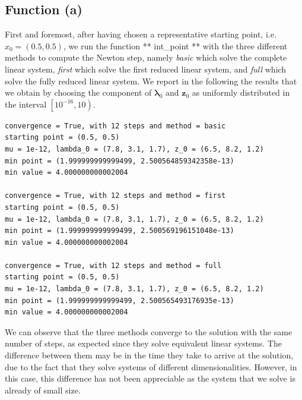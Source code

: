 \documentclass[a4paper,11pt]{article}
\begin{document}
\subsection*{Function (a)}
First and foremost, after having chosen a representative starting point, i.e.~$x_{0}=(0.5,0.5)$, we run the function ** int\_point ** with the three different methods to compute the Newton step, namely \textit{basic} which solve the complete linear system, \textit{first} which solve the first reduced linear system, and \textit{full} which solve the fully reduced linear system. We report in the following the results that we obtain by choosing the component of $\boldsymbol{\lambda}_{0}$ and $\textbf{z}_{0}$ as uniformly distributed in the interval $\left[10^{-16},10\right)$.
\begin{verbatim}
convergence = True, with 12 steps and method = basic
starting point = (0.5, 0.5)
mu = 1e-12, lambda_0 = (7.8, 3.1, 1.7), z_0 = (6.5, 8.2, 1.2)
min point = (1.999999999999499, 2.500564859342358e-13)
min value = 4.000000000002004

convergence = True, with 12 steps and method = first
starting point = (0.5, 0.5)
mu = 1e-12, lambda_0 = (7.8, 3.1, 1.7), z_0 = (6.5, 8.2, 1.2)
min point = (1.999999999999499, 2.500569196151048e-13)
min value = 4.000000000002004

convergence = True, with 12 steps and method = full
starting point = (0.5, 0.5)
mu = 1e-12, lambda_0 = (7.8, 3.1, 1.7), z_0 = (6.5, 8.2, 1.2)
min point = (1.999999999999499, 2.500565493176935e-13)
min value = 4.000000000002004
\end{verbatim}

\noindent We can observe that the three methods converge to the solution with the same number of steps, as expected since they solve equivalent linear systems. The difference between them may be in the time they take to arrive at the solution, due to the fact that they solve systems of different dimensionalities. However, in this case, this difference has not been appreciable as the system that we solve is already of small size.\\
\end{document}

